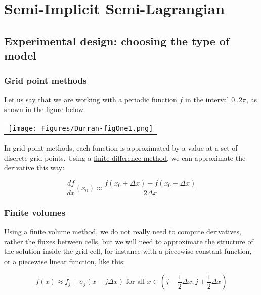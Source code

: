 \chapter{Semi-Implicit Semi-Lagrangian}

\section{Experimental design: choosing the type of model}
\subsection{Grid point methods}
	
	Let us say that we are working with a periodic function $f$ in the interval $0..2\pi$, as shown in the figure below.
	
	\begin{center}
		\begin{tabular}{c}
			\texttt{[image: Figures/Durran-figOne1.png]}
		\end{tabular}
	\end{center}
	
	In grid-point methods, each function is approximated by a value at a set of discrete grid points. Using a \underline{finite difference method}, we can approximate the derivative this way:
	
	\begin{equation}
		\frac{df}{dx}(x_0)\approx \frac{f(x_0+\Delta x)-f(x_0- \Delta x)}{2\Delta x}
	\end{equation}

\subsection{Finite volumes}

	Using a \underline{finite volume method}, we do not really need to compute derivatives, rather the fluxes between cells, but we will need to approximate the structure of the solution inside the grid cell, for instance with a piecewise constant function, or a piecewise linear function, like this:
	
	\begin{equation}
		f(x)\approx f_j +\sigma_j(x-j \Delta x) \text{ for all } x \in (j-\frac{1}{2}\Delta x,j+\frac{1}{2}\Delta x)
	\end{equation}
	
